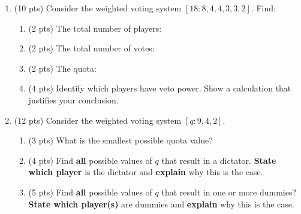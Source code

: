 \documentclass[12pt]{article}
\renewcommand{\emph}[1]{\textsf{\textbf{#1}}}
\begin{document}
\begin{enumerate}
	\begin{enumerate}

	\item(3 pts.) Who would win the A vs.~C head-to-head vote? Show your work.
\vfill

	\item (3 pts.) Is there a Condorcet winner? Explain why or why not.
\vfill
	\item  (4 pts.) Who would win by Copeland's method? Show work to support your answer.
	\vfill
	\end{enumerate}


\newpage
\item (10 pts) Consider the weighted voting system $[18: 8,4,4,3,3,2]$. Find:

	\begin{enumerate}
	\item (2 pts) The total number of players: \vspace{0.4in}

	\item (2 pts) The total number of votes: \vspace{0.4in}

	\item (2 pts) The quota: \vspace{0.4in}

	\item (4 pts) Identify which players have veto power. Show a calculation that justifies your conclusion.
	\vspace{1in}
	\end{enumerate}

\item (12 pts)  Consider the weighted voting system $[q: 9, 4, 2]$.

	\begin{enumerate}
	\item (3 pts) What is the smallest possible quota value? \vspace{0.5in}

	\item (4 pts) Find \emph{all} possible values of $q$ that result in a dictator.  \emph{State which player} is the dictator and \emph{explain} why this is the case. \vfill
	\item (5 pts) Find \emph{all} possible values of $q$ that result in one or more dummies? \emph{State which player(s)} are dummies and \emph{explain} why this is the case. \vfill \vfill	\end{enumerate}


\end{enumerate}
\end{document}
